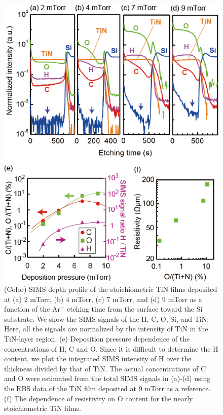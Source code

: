 \documentclass{report}
\begin{document}
\begin{figure}
\begin{center}
\includegraphics{SIMS2-9.jpg}
\end{center}

\caption{(Color) SIMS depth profile of the stoichiometric TiN films deposited at (a) 2 mTorr, (b) 4 mTorr, (c) 7 mTorr, and (d) 9 mTorr as a function of the Ar$^{+}$ etching time from the surface toward the Si substrate. We show the SIMS signals of the H, C, O, Si, and TiN. Here, all the signals are normalized by the intensity of TiN in the TiN-layer region. (e) Deposition pressure dependence of the concentrations of H, C and O. Since it is difficult to determine the H content, we plot the integrated SIMS intensity of H over the thickness divided by that of TiN. The actual concentrations of C and O were estimated from the total SIMS signals in (a)-(d) using the RBS data of the TiN film deposited at 9 mTorr as a reference.  (f)  The dependence of resistivity on O content for the nearly stoichiometric TiN films.}
\label{SIMS2-9}
\end{figure}
\end{document}

